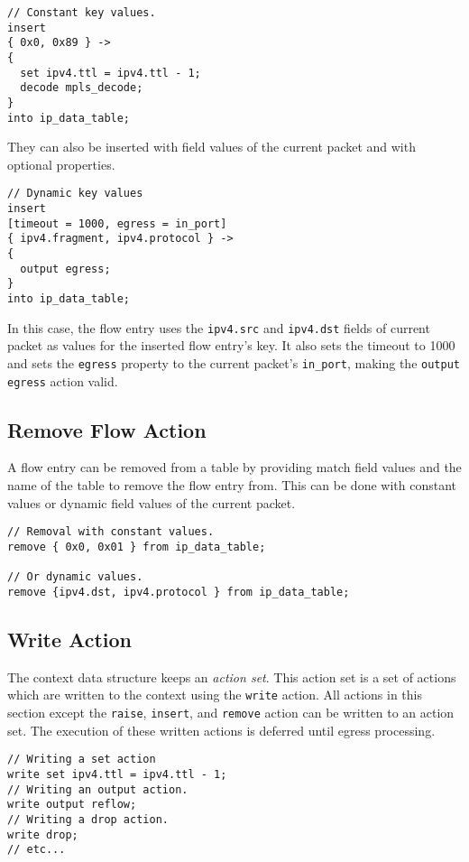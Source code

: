 \begin{lstlisting}
// Constant key values.
insert
{ 0x0, 0x89 } ->
{
  set ipv4.ttl = ipv4.ttl - 1;
  decode mpls_decode;
} 
into ip_data_table;
\end{lstlisting}

They can also be inserted with field values of the current packet and with optional properties.

\begin{lstlisting}
// Dynamic key values
insert
[timeout = 1000, egress = in_port]
{ ipv4.fragment, ipv4.protocol } ->
{
  output egress;
} 
into ip_data_table;
\end{lstlisting}

In this case, the flow entry uses the \texttt{ipv4.src} and \texttt{ipv4.dst} fields of current packet as values for the inserted flow entry's key. It also sets the timeout to 1000 and sets the \texttt{egress} property to the current packet's \texttt{in\_port}, making the \texttt{output egress} action valid.

\subsection{Remove Flow Action} \label{tut:remove_flow_action}

A flow entry can be removed from a table by providing match field values and the name of the table to remove the flow entry from. This can be done with constant values or dynamic field values of the current packet.

\begin{lstlisting}
// Removal with constant values.
remove { 0x0, 0x01 } from ip_data_table;

// Or dynamic values.
remove {ipv4.dst, ipv4.protocol } from ip_data_table;
\end{lstlisting}

\subsection{Write Action} \label{tut:write_action}

The context data structure keeps an \textit{action set}. This action set is a set of actions which are written to the context using the \texttt{write} action. All actions in this section except the \texttt{raise}, \texttt{insert}, and \texttt{remove} action can be written to an action set. The execution of these written actions is deferred until egress processing.

\begin{lstlisting}
// Writing a set action
write set ipv4.ttl = ipv4.ttl - 1;
// Writing an output action.
write output reflow;
// Writing a drop action.
write drop;
// etc...
\end{lstlisting}

